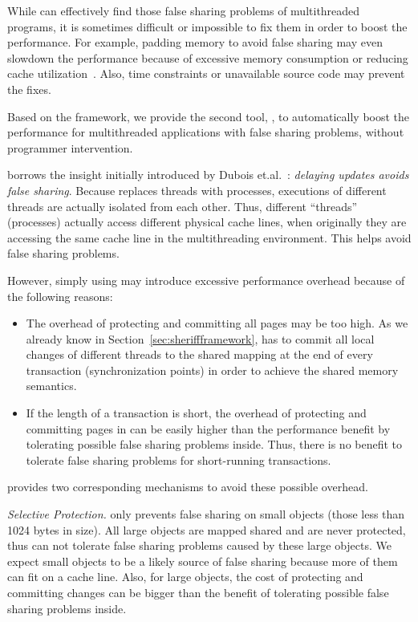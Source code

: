 \label{sec:sheriffprotect}
While \SheriffDetect{} can effectively find those false sharing problems of multithreaded programs, it is sometimes difficult or impossible to fix them in order to boost the performance. For example, padding memory to avoid false sharing may even slowdown the performance because of excessive memory consumption or reducing cache utilization~\cite{qinzhao}. Also, time constraints or unavailable source code may prevent the fixes. 

Based on the \sheriff{} framework, we provide the second tool, \SheriffProtect{}, to automatically boost the performance for multithreaded applications with false sharing problems, without programmer intervention.  

\SheriffProtect{} borrows the insight initially introduced by Dubois et.al.~\cite{Dubois:1991:DCE:125826.125941}: {\it delaying updates avoids false sharing}. Because \Sheriff{} replaces threads with processes, executions of different threads are actually isolated from each other. Thus, different ``threads'' (processes) actually access different physical cache lines, when originally they are accessing the same cache line in the multithreading environment. This helps avoid false sharing problems. 

However, simply using \sheriff{} may introduce excessive performance overhead because of the following reasons: 

\begin{itemize}
\item
The overhead of protecting and committing all pages may be too high. As we already know in Section~\ref{sec:sheriffframework}, \sheriff{} has to commit all local changes of different threads  to the shared mapping at the end of every transaction (synchronization points) in order to achieve the shared memory semantics. 

\item
If the length of a transaction is short, the overhead of protecting and committing pages in \sheriff{} can be easily higher than the performance benefit by tolerating possible false sharing problems inside. Thus, there is no benefit to tolerate false sharing problems for short-running transactions. 

\end{itemize}

\sheriffprotect{} provides two corresponding mechanisms to avoid these possible overhead. 

\emph{Selective Protection.} 
\SheriffProtect{} only prevents false sharing on small objects (those less than 1024 bytes in size). All large objects are mapped shared and are never protected, thus can not tolerate false sharing problems caused by these large objects. We expect  small objects to be a likely source of false sharing because more of them can fit on a cache line. Also, for large objects, the cost of protecting and committing changes can be bigger than the benefit of tolerating possible false sharing problems inside. 

